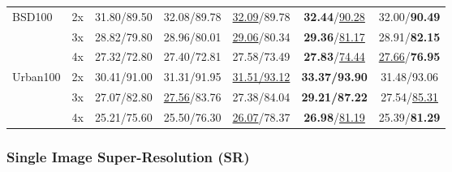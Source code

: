 \documentclass[10pt,journal,compsoc]{IEEEtran}
\newcommand\bdr[1]{{\textbf{#1}}}
\newcommand\bdb[1]{{\underline{#1}}}
\begin{document}
\begin{table}[t!]
\begin{scriptsize}
\begin{center}
\begin{tabular}{l c ccccc}
\multirow{3}{*}{BSD100}

& 2x & 31.80/89.50 & 32.08/89.78 & \bdb{32.09}/89.78 & \bdr{32.44}/\bdb{90.28} & 32.00/\bdr{90.49} \\

& 3x & 28.82/79.80 & 28.96/80.01 & \bdb{29.06}/80.34 & \bdr{29.36}/\bdb{81.17} & 28.91/\bdr{82.15} \\

& 4x & 27.32/72.80 & 27.40/72.81 & 27.58/73.49 & \bdr{27.83}/\bdb{74.44} & \bdb{27.66}/\bdr{76.95} \\

\hline


\multirow{3}{*}{Urban100}

& 2x & 30.41/91.00 & 31.31/91.95 & \bdb{31.51/93.12} & \bdr{33.37/93.90} & 31.48/93.06 \\

& 3x & 27.07/82.80 & \bdb{27.56}/83.76 & 27.38/84.04 & \bdr{29.21/87.22} & 27.54/\bdb{85.31} \\

& 4x & 25.21/75.60 & 25.50/76.30 & \bdb{26.07}/78.37 & \bdr{26.98}/\bdb{81.19} & 25.39/\bdr{81.29} \\

\hline

\end{tabular}\end{center}
\end{scriptsize}
\end{table}










\subsubsection{Single Image Super-Resolution (SR)}
\label{sec:result_sr}
\end{document}
